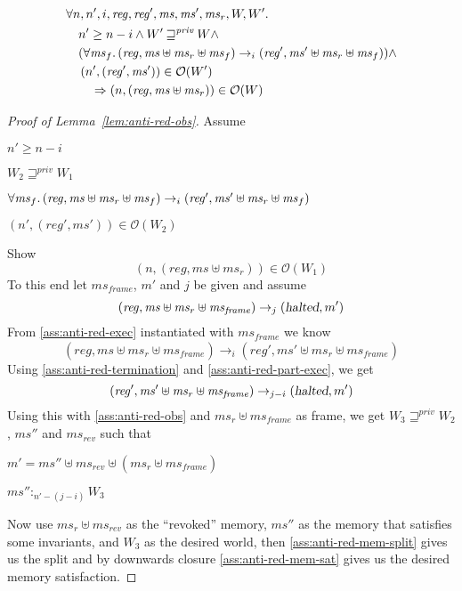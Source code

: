 \documentclass[a4paper]{article}
\newcommand{\var}[1]{\mathit{#1}}
\newcommand{\hs}{\var{ms}}
\newcommand{\ms}{\hs}
\newcommand{\reg}{\var{reg}}
\newcommand{\heap}{\var{mem}}
\newcommand{\halted}{\textsl{halted}}
\newcommand{\futurestr}{\mathbin{\sqsupseteq}^{\var{priv}}}
\newcommand{\heapSat}[3][\heap]{#1 :_{#2} #3}
\newcommand{\memSat}[3][n]{\heapSat[#2]{#1}{#3}}
\newcommand{\observations}{\mathcal{O}}
\newcommand{\npair}[2][n]{\left(#1,#2 \right)}
\newcommand{\step}[1][]{\rightarrow_{#1}}
\begin{document}
\begin{lemma}[Anti-reduction for $\observations$]
\label{lem:anti-red-obs}
  \begin{align*}
    & \forall n, n',i,\reg, \reg', \ms, \ms', \ms_r, W, W' \ldotp\\
    & \quad n' \geq n - i \land W' \futurestr W \land \\
    & \quad (\forall \ms_f \ldotp (\reg,\ms \uplus \ms_r \uplus \ms_f) \step[i] (\reg',\ms' \uplus \ms_r \uplus \ms_f)) \land \\
    & \quad \npair[n']{(\reg',\ms')} \in \observations(W') \\
    & \qquad \Rightarrow \npair{(\reg,\ms \uplus \ms_r)} \in \observations(W)
  \end{align*}
\end{lemma}
\begin{proof}[Proof of Lemma~\ref{lem:anti-red-obs}]
  Assume
  \begin{enumproof} 
    \item $n' \geq n - i$ \label{ass:anti-red-steps}
    \item $W_2 \futurestr W_1$ \label{ass:anti-red-ftrworld}
    \item $\forall \ms_f \ldotp (\reg,\ms \uplus \ms_r \uplus \ms_f) \step[i] (\reg',\ms' \uplus \ms_r \uplus \ms_f)$ \label{ass:anti-red-exec}
    \item $\npair[n']{(\reg',\ms')} \in \observations(W_2)$ \label{ass:anti-red-obs}
  \end{enumproof}
  Show 
  \[
    \npair{(\reg,\ms \uplus \ms_r)}  \in \observations(W_1)
  \]
  To this end let $\ms_{\var{frame}}$, $m'$ and $j$ be given and assume
  \begin{equation}
    \label{ass:anti-red-termination}
    (\reg,\ms \uplus \ms_r \uplus \ms_{\var{frame}}) \step[j] (\halted,m')
  \end{equation}
  From \ref{ass:anti-red-exec} instantiated with $\ms_{\var{frame}}$ we know
  \begin{equation}
    \label{ass:anti-red-part-exec}
    (\reg,\ms \uplus \ms_r \uplus \ms_{\var{frame}}) \step[i] (\reg',\ms' \uplus \ms_r \uplus \ms_{\var{frame}})
  \end{equation}
  Using \ref{ass:anti-red-termination} and \ref{ass:anti-red-part-exec}, we get 
  \[
    (\reg',\ms' \uplus \ms_r \uplus \ms_{\var{frame}}) \step[j-i] (\halted,m')
  \]
  Using this with \ref{ass:anti-red-obs} and $\ms_r \uplus \ms_{\var{frame}}$ as frame, we get $W_3 \futurestr W_2$, $\ms''$ and $\ms_{\var{rev}}$ such that
  \begin{enumproof}[resume]
    \item $m' = \ms'' \uplus \ms_{\var{rev}} \uplus (\ms_r \uplus \ms_{\var{frame}})$ \label{ass:anti-red-mem-split}
    \item $\memSat[n'-(j-i)]{\ms''}{W_3}$ \label{ass:anti-red-mem-sat}
  \end{enumproof}
  Now use $\ms_r \uplus \ms_{\var{rev}}$ as the ``revoked'' memory, $\ms''$ as the memory that satisfies some invariants, and $W_3$ as the desired world, then \ref{ass:anti-red-mem-split} gives us the split and by downwards closure \ref{ass:anti-red-mem-sat} gives us the desired memory satisfaction.
\end{proof}
\end{document}
